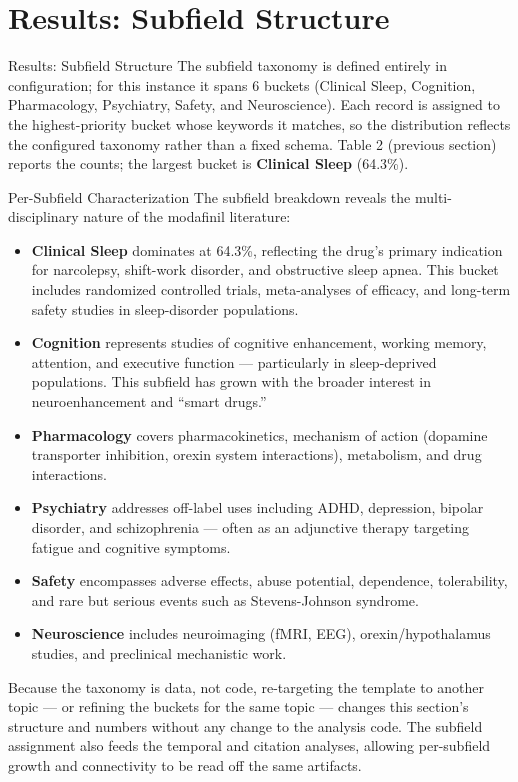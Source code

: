 \documentclass[
  ignorenonframetext,
]{beamer}
\author{\texorpdfstring{}{}}
\date{}
\begin{document}
\section{Results: Subfield Structure}\label{results-subfield-structure}

\begin{frame}[allowframebreaks]{Results: Subfield Structure}
The subfield taxonomy is defined entirely in configuration; for this
instance it spans 6 buckets (Clinical Sleep, Cognition, Pharmacology,
Psychiatry, Safety, and Neuroscience). Each record is assigned to the
highest-priority bucket whose keywords it matches, so the distribution
reflects the configured taxonomy rather than a fixed schema. Table 2
(previous section) reports the counts; the largest bucket is
\textbf{Clinical Sleep} (64.3\%).
\end{frame}

\begin{frame}[allowframebreaks]{Per-Subfield Characterization}
\protect{}\label{per-subfield-characterization}
The subfield breakdown reveals the multi-disciplinary nature of the
modafinil literature:

\begin{itemize}
\item
  \textbf{Clinical Sleep} dominates at 64.3\%, reflecting the drug's
  primary indication for narcolepsy, shift-work disorder, and
  obstructive sleep apnea. This bucket includes randomized controlled
  trials, meta-analyses of efficacy, and long-term safety studies in
  sleep-disorder populations.
\item
  \textbf{Cognition} represents studies of cognitive enhancement,
  working memory, attention, and executive function --- particularly in
  sleep-deprived populations. This subfield has grown with the broader
  interest in neuroenhancement and ``smart drugs.''
\item
  \textbf{Pharmacology} covers pharmacokinetics, mechanism of action
  (dopamine transporter inhibition, orexin system interactions),
  metabolism, and drug interactions.
\item
  \textbf{Psychiatry} addresses off-label uses including ADHD,
  depression, bipolar disorder, and schizophrenia --- often as an
  adjunctive therapy targeting fatigue and cognitive symptoms.
\item
  \textbf{Safety} encompasses adverse effects, abuse potential,
  dependence, tolerability, and rare but serious events such as
  Stevens-Johnson syndrome.
\item
  \textbf{Neuroscience} includes neuroimaging (fMRI, EEG),
  orexin/hypothalamus studies, and preclinical mechanistic work.
\end{itemize}

Because the taxonomy is data, not code, re-targeting the template to
another topic --- or refining the buckets for the same topic --- changes
this section's structure and numbers without any change to the analysis
code. The subfield assignment also feeds the temporal and citation
analyses, allowing per-subfield growth and connectivity to be read off
the same artifacts.
\end{frame}
\end{document}
